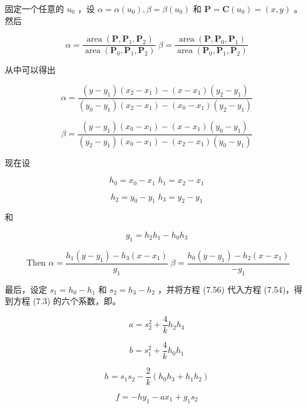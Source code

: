 \documentclass[../main.tex]{subfiles}
\begin{document}
固定一个任意的 \({u}_{0}\) ，设 \(\alpha  = \alpha \left( {u}_{0}\right) ,\beta  = \beta \left( {u}_{0}\right)\) 和 \(\mathbf{P} = \mathbf{C}\left( {u}_{0}\right)  = \left( {x,y}\right)\) 。然后

\[
\alpha  = \frac{\operatorname{area}\left( {\mathbf{P},{\mathbf{P}}_{1},{\mathbf{P}}_{2}}\right) }{\operatorname{area}\left( {{\mathbf{P}}_{0},{\mathbf{P}}_{1},{\mathbf{P}}_{2}}\right) }\;\beta  = \frac{\operatorname{area}\left( {\mathbf{P},{\mathbf{P}}_{0},{\mathbf{P}}_{1}}\right) }{\operatorname{area}\left( {{\mathbf{P}}_{0},{\mathbf{P}}_{1},{\mathbf{P}}_{2}}\right) }
\]

从中可以得出

\[
\alpha  = \frac{\left( {y - {y}_{1}}\right) \left( {{x}_{2} - {x}_{1}}\right)  - \left( {x - {x}_{1}}\right) \left( {{y}_{2} - {y}_{1}}\right) }{\left( {{y}_{0} - {y}_{1}}\right) \left( {{x}_{2} - {x}_{1}}\right)  - \left( {{x}_{0} - {x}_{1}}\right) \left( {{y}_{2} - {y}_{1}}\right) }
\]

\[
\beta  = \frac{\left( {y - {y}_{1}}\right) \left( {{x}_{0} - {x}_{1}}\right)  - \left( {x - {x}_{1}}\right) \left( {{y}_{0} - {y}_{1}}\right) }{\left( {{y}_{2} - {y}_{1}}\right) \left( {{x}_{0} - {x}_{1}}\right)  - \left( {{x}_{2} - {x}_{1}}\right) \left( {{y}_{0} - {y}_{1}}\right) } \tag{7.55}
\]

现在设

\[
{h}_{0} = {x}_{0} - {x}_{1}\;{h}_{1} = {x}_{2} - {x}_{1}
\]

\[
{h}_{2} = {y}_{0} - {y}_{1}\;{h}_{3} = {y}_{2} - {y}_{1}
\]

和

\[
{g}_{1} = {h}_{2}{h}_{1} - {h}_{0}{h}_{3}
\]

\[
\text{ Then }\alpha  = \frac{{h}_{1}\left( {y - {y}_{1}}\right)  - {h}_{3}\left( {x - {x}_{1}}\right) }{{g}_{1}}\;\beta  = \frac{{h}_{0}\left( {y - {y}_{1}}\right)  - {h}_{2}\left( {x - {x}_{1}}\right) }{-{g}_{1}} \tag{7.56}
\]

最后，设定 \({s}_{1} = {h}_{0} - {h}_{1}\) 和 \({s}_{2} = {h}_{3} - {h}_{2}\) ，并将方程 (7.56) 代入方程 (7.54)，得到方程 (7.3) 的六个系数，即。

\[
a = {s}_{2}^{2} + \frac{4}{k}{h}_{2}{h}_{3}
\]

\[
b = {s}_{1}^{2} + \frac{4}{k}{h}_{0}{h}_{1}
\]

\[
h = {s}_{1}{s}_{2} - \frac{2}{k}\left( {{h}_{0}{h}_{3} + {h}_{1}{h}_{2}}\right)
\]

\[
f =  - h{y}_{1} - a{x}_{1} + {g}_{1}{s}_{2}
\]
\end{document}
